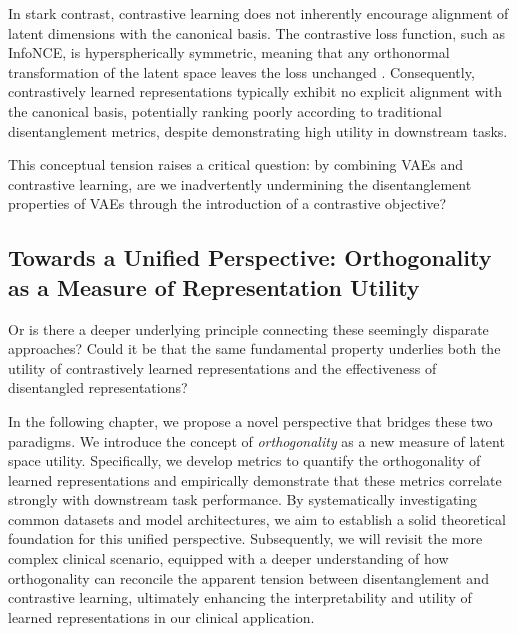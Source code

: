 In stark contrast, contrastive learning does not inherently encourage alignment of latent dimensions with the canonical basis. The contrastive loss function, such as InfoNCE, is hyperspherically symmetric, meaning that any orthonormal transformation of the latent space leaves the loss unchanged \cite{pmlr-v139-zimmermann21a}. Consequently, contrastively learned representations typically exhibit no explicit alignment with the canonical basis, potentially ranking poorly according to traditional disentanglement metrics, despite demonstrating high utility in downstream tasks.

This conceptual tension raises a critical question: by combining VAEs and contrastive learning, are we inadvertently undermining the disentanglement properties of VAEs through the introduction of a contrastive objective?

\subsection{Towards a Unified Perspective: Orthogonality as a Measure of Representation Utility}

Or is there a deeper underlying principle connecting these seemingly disparate approaches? Could it be that the same fundamental property underlies both the utility of contrastively learned representations and the effectiveness of disentangled representations?

In the following chapter, we propose a novel perspective that bridges these two paradigms. We introduce the concept of \textit{orthogonality} as a new measure of latent space utility. Specifically, we develop metrics to quantify the orthogonality of learned representations and empirically demonstrate that these metrics correlate strongly with downstream task performance. By systematically investigating common datasets and model architectures, we aim to establish a solid theoretical foundation for this unified perspective. Subsequently, we will revisit the more complex clinical scenario, equipped with a deeper understanding of how orthogonality can reconcile the apparent tension between disentanglement and contrastive learning, ultimately enhancing the interpretability and utility of learned representations in our clinical application.